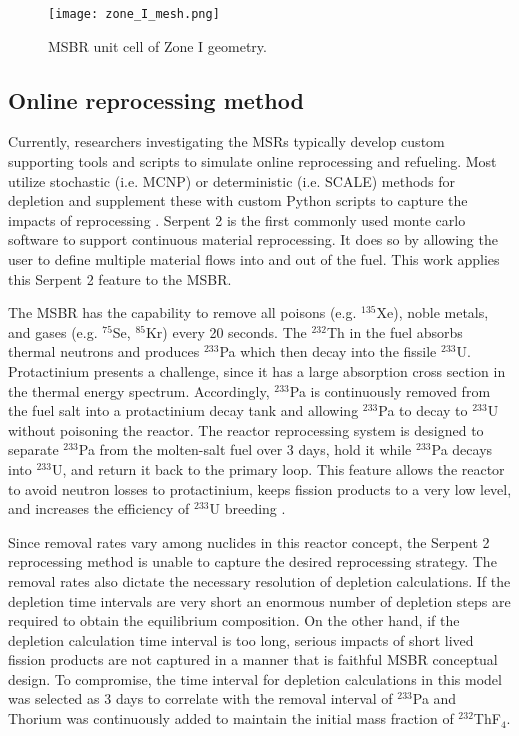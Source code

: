 \documentclass{anstrans}
\begin{document}
\begin{figure}[htbp!] %
        \centering
        \texttt{[image: zone\_I\_mesh.png]}
        \caption{MSBR unit cell of Zone I geometry.}
        \label{fig:zoneI}
\end{figure}

\FloatBarrier
\subsection{Online reprocessing method}

Currently, researchers 
investigating the \glspl{MSR} 
typically develop custom supporting tools and scripts to simulate 
online reprocessing and refueling. Most utilize stochastic (i.e. 
\gls{MCNP}) or deterministic (i.e. SCALE) methods for depletion and supplement 
these with custom Python scripts to capture the impacts of reprocessing 
\cite{jeong_equilibrium_2016,park_whole_2015}. Serpent 2 is the 
first commonly used monte carlo software to support continuous material 
reprocessing. It does so by allowing the user to 
define multiple material flows into and out of the fuel. This work applies this 
Serpent 2 feature to the \gls{MSBR}. 

The \gls{MSBR} has the capability to remove all poisons
(e.g. 
$^{135}$Xe), noble metals, and gases (e.g. $^{75}$Se, $^{85}$Kr) 
every 20 seconds. The $^{232}$Th in the fuel absorbs thermal 
neutrons and produces $^{233}$Pa which then decay into the fissile $^{233}$U. 
Protactinium presents a challenge, since it has a large absorption cross section in the thermal 
energy spectrum. Accordingly, $^{233}$Pa is continuously removed from the fuel salt 
into a protactinium decay tank and allowing $^{233}$Pa to decay to $^{233}$U without 
poisoning the reactor. The reactor reprocessing system is designed to separate 
$^{233}$Pa from the molten-salt fuel over 3 days, hold it while $^{233}$Pa 
decays into $^{233}$U, and return it back to the primary loop. This feature allows the reactor to 
avoid neutron losses to protactinium, keeps fission products to a very low level, and 
increases the efficiency of $^{233}$U breeding \cite{robertson_conceptual_1971}.

Since removal rates vary among nuclides in this reactor concept, the Serpent 2 
reprocessing method is unable to capture the desired reprocessing strategy. 
The removal rates also dictate the necessary resolution of depletion 
calculations. If the depletion time intervals are 
very short an enormous number of depletion steps are required to
obtain the equilibrium composition. On the other hand, if the depletion 
calculation time interval is too long, serious impacts of short lived fission 
products are not captured in a manner that is faithful \gls{MSBR} conceptual design. 
To compromise, the time interval for depletion calculations in this model was selected 
as 3 days to correlate with the removal interval of $^{233}$Pa and Thorium was 
continuously added to maintain the initial mass fraction of $^{232}$ThF$_4$.
\end{document}
